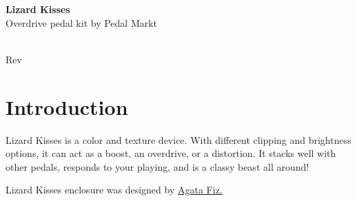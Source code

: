\documentclass[a4paper,12pt]{article}
\begin{document}
\begin{titlepage}
  \begin{center}
    \Large\textbf{Lizard Kisses}\\
    \large{Overdrive pedal kit by Pedal Markt}
  \end{center}
  \vspace*{\fill}
  \begin{center}
    \vhCurrentDate\\
    { Rev}\vhCurrentVersion
  \end{center}
\end{titlepage}

\tableofcontents
\pagebreak

\section{Introduction}
Lizard Kisses is a color and texture device. With different
clipping and brightness options, it can act as a boost, an
overdrive, or a distortion. It stacks well with other pedals,
responds to your playing, and is a classy beast all around!

Lizard Kisses enclosure was designed by \href{https://fiz.gallery/}{Agata Fiz.}
\end{document}
